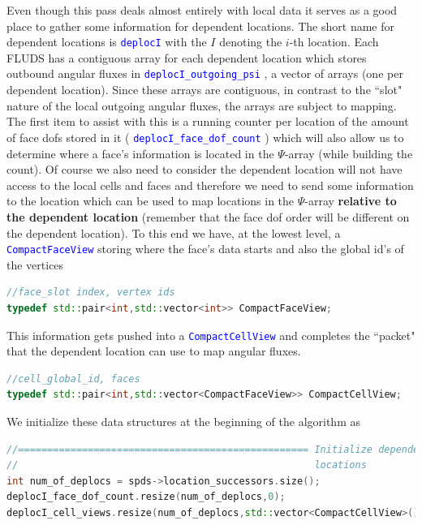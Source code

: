 \documentclass[11pt,letterpaper,titlepage]{article}
\newcommand{\xmltag}[1]{\textcolor{blue}{ \texttt{#1}} }
\numberwithin{equation}{section}
\begin{document}
Even though this pass deals almost entirely with local data it serves as a good place to gather some information for dependent locations. The short name for dependent locations is \xmltag{deplocI} with the $I$ denoting the $i$-th location. Each FLUDS has a contiguous array for each dependent location which stores outbound angular fluxes in \xmltag{deplocI\_outgoing\_psi}, a vector of arrays (one per dependent location). Since these arrays are contiguous, in contrast to the ``slot" nature of the local outgoing angular fluxes, the arrays are subject to mapping. The first item to assist with this is a running counter per location of the amount of face dofs stored in it (\xmltag{deplocI\_face\_dof\_count}) which will also allow us to determine where a face's information is located in the $\Psi$-array (while building the count). 
\newline
\newline
Of course we also need to consider the dependent location will not have access to the local cells and faces and therefore we need to send some information to the location which can be used to map locations in the $\Psi$-array \textbf{relative to the dependent location} (remember that the face dof order will be different on the dependent location). To this end we have, at the lowest level, a \xmltag{CompactFaceView} storing where the face's data starts and also the global id's of the vertices
\vspace{0.25cm}
\begin{lstlisting}[language=c++]
//face_slot index, vertex ids
typedef std::pair<int,std::vector<int>> CompactFaceView;
\end{lstlisting}
This information gets pushed into a \xmltag{CompactCellView} and completes the ``packet" that the dependent location can use to map angular fluxes.
\vspace{0.25cm}
\begin{lstlisting}[language=c++]
//cell_global_id, faces
typedef std::pair<int,std::vector<CompactFaceView>> CompactCellView;
\end{lstlisting} 
We initialize these data structures at the beginning of the algorithm as

\vspace{0.25cm}
\begin{lstlisting}[language=c++]
//================================================== Initialize dependent
//                                                   locations
int num_of_deplocs = spds->location_successors.size();
deplocI_face_dof_count.resize(num_of_deplocs,0);
deplocI_cell_views.resize(num_of_deplocs,std::vector<CompactCellView>());
\end{lstlisting}
\end{document}
